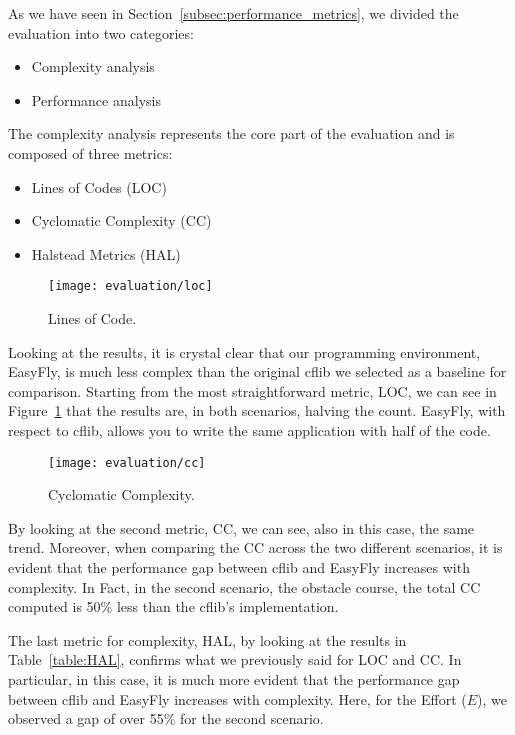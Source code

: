 As we have seen in Section~\ref{subsec:performance_metrics}, we divided the evaluation into two categories:
\begin{itemize}
    \item Complexity analysis
    \item Performance analysis
\end{itemize}

The complexity analysis represents the core part of the evaluation and is composed of three metrics:
\begin{itemize}
    \item Lines of Codes (LOC)
    \item Cyclomatic Complexity (CC)
    \item Halstead Metrics (HAL)
\end{itemize}

\begin{figure}[tb]
    \centering
    \texttt{[image: evaluation/loc]}
    \caption{Lines of Code.}\label{fig:loc_count}
\end{figure}

Looking at the results, it is crystal clear that our programming environment, EasyFly, is much less complex than the original cflib we selected as a baseline for comparison.
Starting from the most straightforward metric, LOC, we can see in Figure~\ref{fig:loc_count} that the results are, in both scenarios, halving the count.
EasyFly, with respect to cflib, allows you to write the same application with half of the code.

\begin{figure}[tb]
    \centering
    \texttt{[image: evaluation/cc]}
    \caption{Cyclomatic Complexity.}\label{fig:cc}
\end{figure}

By looking at the second metric, CC, we can see, also in this case, the same trend.
Moreover, when comparing the CC across the two different scenarios, it is evident that the performance gap between cflib and EasyFly increases with complexity.
In Fact, in the second scenario, the obstacle course, the total CC computed is 50\% less than the cflib's implementation.

The last metric for complexity, HAL, by looking at the results in Table~\ref{table:HAL}, confirms what we previously said for LOC and CC. 
In particular, in this case, it is much more evident that the performance gap between cflib and EasyFly increases with complexity.
Here, for the Effort (\( E \)), we observed a gap of over 55\% for the second scenario.

